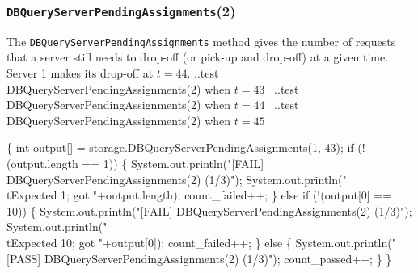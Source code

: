 \documentclass{article}
\def\nwendcode{\endtrivlist \endgroup}
\let\nwdocspar=\par
\begin{document}
\subsubsection{{\tt{}DBQueryServerPendingAssignments}(2)}
The {\tt{}DBQueryServerPendingAssignments} method gives the number of requests that
a server still needs to drop-off (or pick-up and drop-off) at a given time.
Server 1 makes its drop-off at $t=44$.
\nwenddocs{}\endmoddef{}
  \LA{}..test \code{}DBQueryServerPendingAssignments\edoc{}(2) when $t=43$~{\nwtagstyle{}}\RA{}
  \LA{}..test \code{}DBQueryServerPendingAssignments\edoc{}(2) when $t=44$~{\nwtagstyle{}}\RA{}
  \LA{}..test \code{}DBQueryServerPendingAssignments\edoc{}(2) when $t=45$~{\nwtagstyle{}}\RA{}
\nwendcode{}\nwdocspar
\nwenddocs{}\endmoddef{}
\{
  int output[] = storage.DBQueryServerPendingAssignments(1, 43);
  if (!(output.length == 1)) \{
    System.out.println("[FAIL] DBQueryServerPendingAssignments(2) (1/3)");
    System.out.println("\\tExpected 1; got "+output.length);
    count_failed++;
  \} else if (!(output[0] == 10)) \{
    System.out.println("[FAIL] DBQueryServerPendingAssignments(2) (1/3)");
    System.out.println("\\tExpected 10; got "+output[0]);
    count_failed++;
  \} else \{
    System.out.println("[PASS] DBQueryServerPendingAssignments(2) (1/3)");
    count_passed++;
  \}
\}
\nwendcode{}\nwdocspar
\nwenddocs{}\endmoddef{}
\end{document}
